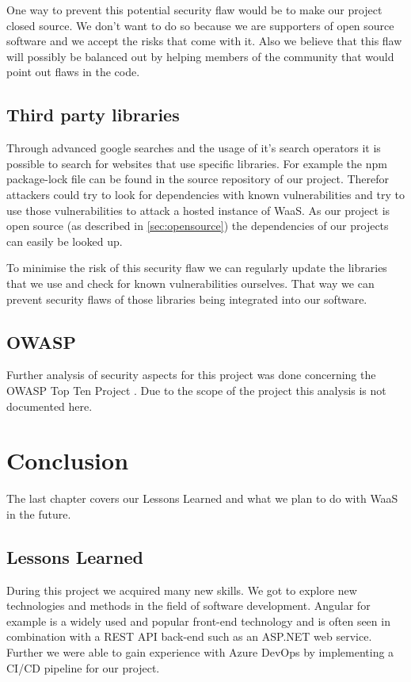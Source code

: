 \documentclass[titlepage, 12pt]{article}
\begin{document}
One way to prevent this potential security flaw would be to make our project closed source. We don't want to do so because we are supporters of open source software and we accept the risks that come with it. Also we believe that this flaw will possibly be balanced out by helping members of the community that would point out flaws in the code.


\subsection{Third party libraries}

Through advanced google searches and the usage of it's search operators it is possible to search for websites that use specific libraries. For example the npm package-lock file can be found in the source repository of our project. Therefor attackers could try to look for dependencies with known vulnerabilities and try to use those vulnerabilities to attack a hosted instance of WaaS. As our project is open source (as described in \ref{sec:opensource}) the dependencies of our projects can easily be looked up.

To minimise the risk of this security flaw we can regularly update the libraries that we use and check for known vulnerabilities ourselves. That way we can prevent security flaws of those libraries being integrated into our software.

\subsection{OWASP}

Further analysis of security aspects for this project was done concerning the OWASP Top Ten Project \cite{mOWASPTopTen}. Due to the scope of the project this analysis is not documented here.

\section{Conclusion}

The last chapter covers our Lessons Learned and what we plan to do with WaaS in the future.

\subsection{Lessons Learned}
\label{section:LessonsLearned}

During this project we acquired many new skills. We got to explore new technologies and methods in the field of software development. Angular for example is a widely used and popular front-end technology and is often seen in combination with a REST API back-end such as an ASP.NET web service.
Further we were able to gain experience with Azure DevOps by implementing a CI/CD pipeline for our project.
\end{document}
